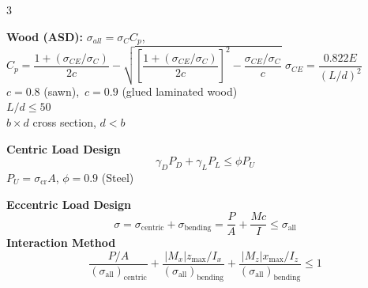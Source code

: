 \documentclass[8pt]{extarticle}
\newcommand{\subsectiontitle}[1]{%
  \vspace{2pt}%
  {\footnotesize\textbf{#1}}\\[-2pt]%
}
\begin{document}
\begin{multicols*}{3}
\columnbreak

\textbf{Wood (ASD):}
$\sigma_{all}=\sigma_C C_p$,\\
{\small
$C_p=\dfrac{1+(\sigma_{CE}/\sigma_C)}{2c}-\sqrt{\left[\dfrac{1+(\sigma_{CE}/\sigma_C)}{2c}\right]^2-\dfrac{\sigma_{CE}/\sigma_C}{c}}$
}
$\sigma_{CE}=\dfrac{0.822E}{(L/d)^2}$\\
$c=0.8$ (sawn),\ $c=0.9$ (glued laminated wood)\\
$L/d\leq50$\\
$ b \times d$ cross section, $d<b$

\subsectiontitle{Centric Load Design}
\[ \gamma_D P_D + \gamma_L P_L \leq \phi P_U \]
$P_U = \sigma_{\text{cr}} A$, $\phi = 0.9$ (Steel)

\subsectiontitle{Eccentric Load Design}
\[ \sigma = \sigma_{\text{centric}} + \sigma_{\text{bending}} = \frac{P}{A} + \frac{M c}{I} \leq \sigma_{\text{all}} \]
\subsectiontitle{Interaction Method}
\[ \frac{P/A}{(\sigma_{\text{all}})_{\text{centric}}} + \frac{|M_x| z_{\text{max}} / I_x}{(\sigma_{\text{all}})_{\text{bending}}} + \frac{|M_z| x_{\text{max}} / I_z}{(\sigma_{\text{all}})_{\text{bending}}} \le 1 \]


\end{multicols*}
\end{document}
